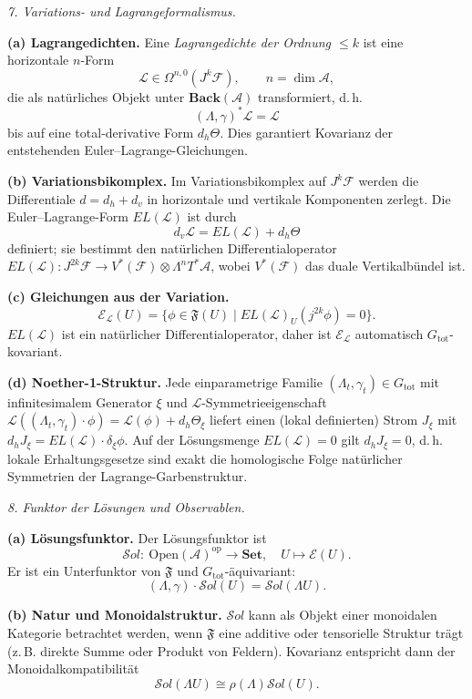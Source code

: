 \documentclass[10pt, letterpaper]{article}
\begin{document}
\bigskip
\emph{7. Variations- und Lagrangeformalismus.}

\textbf{(a) Lagrangedichten.}
Eine \emph{Lagrangedichte der Ordnung $\le k$} ist eine horizontale $n$-Form
\[
\mathcal L\in \Omega^{n,0}(J^k\mathcal F),
\qquad n=\dim\mathcal A,
\]
die als natürliches Objekt unter $\mathbf{Back}(\mathcal A)$ transformiert,
d.\,h.
\[
(\Lambda,\gamma)^\ast\mathcal L = \mathcal L
\]
bis auf eine total-derivative Form $d_h\Theta$.
Dies garantiert Kovarianz der entstehenden Euler–Lagrange-Gleichungen.

\textbf{(b) Variationsbikomplex.}
Im Variationsbikomplex auf $J^k\mathcal F$ werden die Differentiale
$d=d_h+d_v$ in horizontale und vertikale Komponenten zerlegt.
Die Euler–Lagrange-Form $EL(\mathcal L)$ ist durch
\[
d_v\mathcal L = EL(\mathcal L) + d_h\Theta
\]
definiert; sie bestimmt den natürlichen Differentialoperator
$EL(\mathcal L):J^{2k}\mathcal F\to V^\ast(\mathcal F)\otimes\Lambda^nT^\ast\mathcal A$,
wobei $V^\ast(\mathcal F)$ das duale Vertikalbündel ist.

\textbf{(c) Gleichungen aus der Variation.}
\[
\mathcal E_{\mathcal L}(U)
=\{\phi\in\mathfrak F(U)\mid EL(\mathcal L)_U(j^{2k}\phi)=0\}.
\]
$EL(\mathcal L)$ ist ein natürlicher Differentialoperator,
daher ist $\mathcal E_{\mathcal L}$ automatisch $G_{\mathrm{tot}}$-kovariant.

\textbf{(d) Noether-1-Struktur.}
Jede einparametrige Familie $(\Lambda_t,\gamma_t)\in G_{\mathrm{tot}}$
mit infinitesimalem Generator $\xi$ und
$\mathcal L$-Symmetrieeigenschaft
$\mathcal L((\Lambda_t,\gamma_t)\cdot\phi)=\mathcal L(\phi)+d_h\Theta_\xi$
liefert einen (lokal definierten) Strom $J_\xi$ mit
$d_h J_\xi = EL(\mathcal L)\cdot \delta_\xi\phi$.
Auf der Lösungsmenge $EL(\mathcal L)=0$ gilt $d_h J_\xi=0$,
d.\,h. lokale Erhaltungsgesetze sind exakt
die homologische Folge natürlicher Symmetrien der Lagrange-Garbenstruktur.

\bigskip
\emph{8. Funktor der Lösungen und Observablen.}

\textbf{(a) Lösungsfunktor.}
Der Lösungsfunktor ist
\[
\mathcal S ol:\ \mathrm{Open}(\mathcal A)^{\mathrm{op}}\longrightarrow \mathbf{Set},
\quad
U\longmapsto \mathcal E(U).
\]
Er ist ein Unterfunktor von $\mathfrak F$ und $G_{\mathrm{tot}}$-äquivariant:
\[
(\Lambda,\gamma)\cdot \mathcal S ol(U)
= \mathcal S ol(\Lambda U).
\]

\textbf{(b) Natur und Monoidalstruktur.}
$\mathcal S ol$ kann als Objekt einer monoidalen Kategorie betrachtet werden,
wenn $\mathfrak F$ eine additive oder tensorielle Struktur trägt
(z.\,B. direkte Summe oder Produkt von Feldern).
Kovarianz entspricht dann der Monoidalkompatibilität
\[
\mathcal S ol(\Lambda U)\cong\rho(\Lambda)\mathcal S ol(U).
\]
\end{document}
